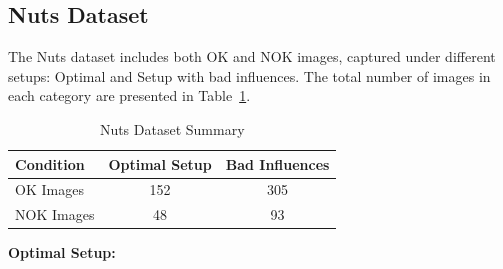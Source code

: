 \documentclass[12pt,DIV14,BCOR12mm,a4paper,footinclude=false,headinclude,parskip=half-,twoside,openright,cleardoublepage=empty,toc=index,bibliography=totoc,listof=totoc]{scrreprt}
\numberwithin{equation}{chapter}
\begin{document}
\subsection{Nuts Dataset}
\label{sec:nuts_dataset}
The Nuts dataset includes both OK and NOK images, captured under different setups: Optimal and Setup with bad influences. The total number of images in each category are presented in Table~\ref{tab:nuts-dataset}.

\begin{table}
    \centering
    \caption{Nuts Dataset Summary}
    \label{tab:nuts-dataset}
    \begin{tabular}{lcc}
        \toprule
        \textbf{Condition} & \textbf{Optimal Setup} & \textbf{Bad Influences} \\ 
        \midrule
        OK Images          & 152                    & 305                     \\ 
        NOK Images         & 48                     & 93                      \\ 
        \bottomrule
    \end{tabular}
\end{table}


\textbf{Optimal Setup:}
\end{document}
